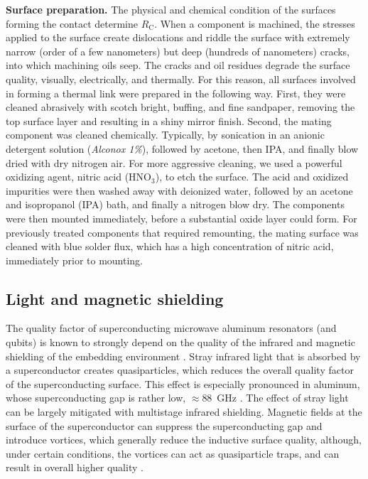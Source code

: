 \textbf{\label{par: Surface-preparation}Surface preparation. }The
physical and chemical condition of the surfaces forming the contact
determine $R_{\mathrm{C}}$. When a component is machined, the stresses
applied to the surface create dislocations and riddle the surface
with extremely narrow (order of a few nanometers) but deep (hundreds
of nanometers) cracks, into which machining oils seep. The cracks
and oil residues degrade the surface quality, visually, electrically,
and thermally. For this reason, all surfaces involved in forming a
thermal link were prepared in the following way. First, they were
cleaned abrasively with scotch bright, buffing, and  fine sandpaper,
removing the top surface layer and resulting in a shiny mirror finish.
Second, the mating component was cleaned chemically. Typically, by
sonication in an anionic detergent solution (\emph{Alconox 1\%}),
followed by acetone, then IPA, and finally blow dried with dry nitrogen
air. For more aggressive cleaning, we used a powerful oxidizing agent,
nitric acid ($\mathrm{HNO_{3}}$), to etch the surface. The acid and
oxidized impurities were then washed away with deionized water, followed
by an acetone and isopropanol (IPA) bath, and finally a nitrogen blow
dry. The components were then mounted immediately, before a substantial
oxide layer could form. For previously treated components that required
remounting, the mating surface was cleaned with blue solder flux,
which has a high concentration of nitric acid, immediately prior to
mounting.


\subsection{Light and magnetic shielding}

The quality factor of superconducting microwave aluminum resonators
(and qubits) is known to strongly depend on the quality of the infrared
and magnetic shielding of the embedding environment \citep{Barends2011-qp,Wang2014,Kreikebaum2016}.
Stray infrared light that is absorbed by a superconductor creates
quasiparticles, which reduces the overall quality factor of the superconducting
surface. This effect is especially pronounced in aluminum, whose superconducting
gap is rather low, $\approx88$~GHz \citep{Barends2011-qp,deVisser2011-qp}.
The effect of stray light can be largely mitigated with multistage
infrared shielding. Magnetic fields at the surface of the superconductor
can suppress the superconducting gap and introduce vortices, which
generally reduce the inductive surface quality, although, under certain
conditions, the vortices can act as quasiparticle traps, and can result
in overall higher quality \citep{Wang2014,Vool2014-qp}. 

